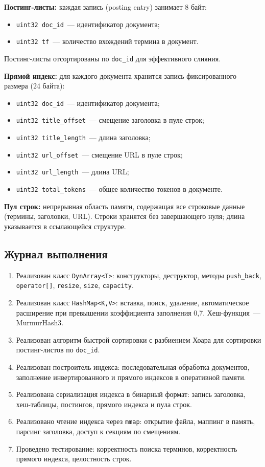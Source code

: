 \documentclass[a4paper,12pt]{article}
\begin{document}
\textbf{Постинг-листы:} каждая запись (posting entry) занимает 8 байт:
\begin{itemize}
    \item \texttt{uint32 doc\_id}~--- идентификатор документа;
    \item \texttt{uint32 tf}~--- количество вхождений термина в документ.
\end{itemize}
Постинг-листы отсортированы по \texttt{doc\_id} для эффективного слияния.

\textbf{Прямой индекс:} для каждого документа хранится запись фиксированного размера (24 байта):
\begin{itemize}
    \item \texttt{uint32 doc\_id}~--- идентификатор документа;
    \item \texttt{uint32 title\_offset}~--- смещение заголовка в пуле строк;
    \item \texttt{uint32 title\_length}~--- длина заголовка;
    \item \texttt{uint32 url\_offset}~--- смещение URL в пуле строк;
    \item \texttt{uint32 url\_length}~--- длина URL;
    \item \texttt{uint32 total\_tokens}~--- общее количество токенов в документе.
\end{itemize}

\textbf{Пул строк:} непрерывная область памяти, содержащая все строковые данные (термины, заголовки, URL). Строки хранятся без завершающего нуля; длина указывается в ссылающейся структуре.

\subsection{Журнал выполнения}

\begin{enumerate}
    \item Реализован класс \texttt{DynArray<T>}: конструкторы, деструктор, методы \texttt{push\_back}, \texttt{operator[]}, \texttt{resize}, \texttt{size}, \texttt{capacity}.
    \item Реализован класс \texttt{HashMap<K,V>}: вставка, поиск, удаление, автоматическое расширение при превышении коэффициента заполнения 0,7. Хеш-функция~--- MurmurHash3.
    \item Реализован алгоритм быстрой сортировки с разбиением Хоара для сортировки постинг-листов по \texttt{doc\_id}.
    \item Реализован построитель индекса: последовательная обработка документов, заполнение инвертированного и прямого индексов в оперативной памяти.
    \item Реализована сериализация индекса в бинарный формат: запись заголовка, хеш-таблицы, постингов, прямого индекса и пула строк.
    \item Реализовано чтение индекса через \texttt{mmap}: открытие файла, маппинг в память, парсинг заголовка, доступ к секциям по смещениям.
    \item Проведено тестирование: корректность поиска терминов, корректность прямого индекса, целостность строк.
\end{enumerate}
\end{document}
